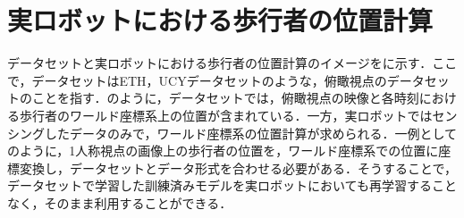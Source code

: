 \section{実ロボットにおける歩行者の位置計算}
データセットと実ロボットにおける歩行者の位置計算のイメージをに示す．ここで，データセットはETH\cite{pellegrini2009you-eth}，UCY\cite{lerner2007crowds-ucy}データセットのような，俯瞰視点のデータセットのことを指す．のように，データセットでは，俯瞰視点の映像と各時刻における歩行者のワールド座標系上の位置が含まれている．一方，実ロボットではセンシングしたデータのみで，ワールド座標系の位置計算が求められる．一例としてのように，1人称視点の画像上の歩行者の位置を，ワールド座標系での位置に座標変換し，データセットとデータ形式を合わせる必要がある．そうすることで，データセットで学習した訓練済みモデルを実ロボットにおいても再学習することなく，そのまま利用することができる．

